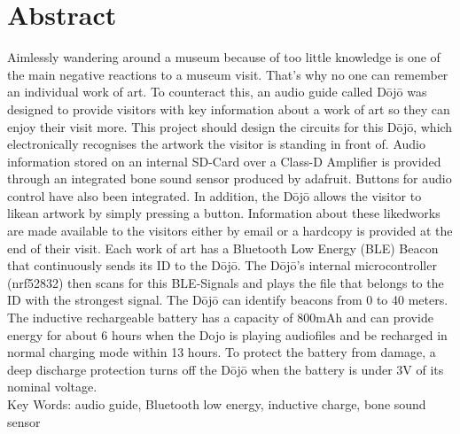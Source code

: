 \section*{Abstract}\label{sec:abstract}
Aimlessly wandering around a museum because of too little knowledge is one of the main negative reactions to a museum visit. That’s why no one can remember an individual work of art. To counteract this, an audio guide called Dōjō was designed to provide visitors with key information about a work of art so they can enjoy their visit more. This project should design the circuits for this Dōjō, which electronically recognises the artwork the visitor is standing in front of. Audio information stored on an internal SD-Card over a Class-D Amplifier is provided through an integrated bone sound sensor produced by adafruit. Buttons for audio control have also been integrated. In addition, the Dōjō allows the visitor to \glqq like\grqq an artwork by simply pressing a button. Information about these \glqq liked\grqq works are made available to the visitors either by email or a hardcopy is provided at the end of their visit. Each work of art has a Bluetooth Low Energy (BLE) Beacon that continuously sends its ID to the Dōjō. The Dōjō’s internal microcontroller (nrf52832) then scans for this BLE-Signals and plays the file that belongs to the ID with the strongest signal. The Dōjō can identify beacons from 0 to 40 meters. The inductive rechargeable battery has a capacity of 800mAh and can provide energy for about 6 hours when the Dojo is playing audiofiles and be recharged in normal charging mode within 13 hours. To protect the battery from damage, a deep discharge protection turns off the Dōjō when the battery is under 3V of its nominal voltage.\\[0.25cm]
Key Words: audio guide, Bluetooth low energy, inductive charge, bone sound sensor